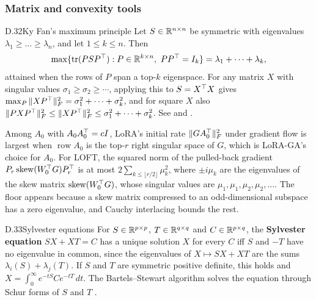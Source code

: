 \subsubsection*{Matrix and convexity tools}

\begin{bgfact}{D.32}{Ky Fan's maximum principle}
Let $S\in\mathbb{R}^{n\times n}$ be symmetric with eigenvalues $\lambda_1\ge\dots\ge\lambda_n$, and let $1\le k\le n$. Then
\[\max\{\tr(PSP\T):P\in\R^{k\times n},\ PP\T=I_k\}=\lambda_1+\dots+\lambda_k,\]
attained when the rows of $P$ span a top-$k$ eigenspace. For any matrix $X$ with singular values
$\sigma_1\ge\sigma_2\ge\cdots$, applying this to $S=X^{\top} X$ gives $\max_P\|XP^{\top}\|_F^2=\sigma_1^2+\dots+\sigma_k^2$, and
for square $X$ also $\|PXP^{\top}\|_F^2\le\|XP^{\top}\|_F^2\le\sigma_1^2+\dots+\sigma_k^2$. See \citet{xfan1949theorem} and
\citet[Ch.~III]{xbhatia1997matrix}.
\end{bgfact}

Among $A_0$ with $A_0A_0^{\top}=cI$, LoRA's initial rate $\|GA_0^{\top}\|_F^2$ under gradient flow is largest when
$\operatorname{row}A_0$ is the top-$r$ right singular space of $G$, which is LoRA-GA's \citep{wang2024lorab} choice for
$A_0$. For LOFT, the squared norm of the pulled-back gradient $P_r\operatorname{skew}(W_0^{\top} G)P_r^{\top}$ is at most $2\sum_{k\le\lfloor
r/2\rfloor}\mu_k^2$, where $\pm i\mu_k$ are the eigenvalues of the skew matrix $\operatorname{skew}(W_0^{\top} G)$, whose singular values
are $\mu_1,\mu_1,\mu_2,\mu_2,\dots$. The floor appears because a skew matrix compressed to an odd-dimensional subspace
has a zero eigenvalue, and Cauchy interlacing bounds the rest.


\begin{bgfact}{D.33}{Sylvester equations}
For $S\in\mathbb{R}^{p\times p}$, $T\in\mathbb{R}^{q\times q}$ and $C\in\mathbb{R}^{p\times q}$, the \textbf{Sylvester equation} $SX+XT=C$ has a
unique solution $X$ for every $C$ iff $S$ and $-T$ have no eigenvalue in common, since the eigenvalues of $X\mapsto
SX+XT$ are the sums $\lambda_i(S)+\lambda_j(T)$. If $S$ and $T$ are symmetric positive definite, this holds and
$X=\int_0^\infty e^{-tS}Ce^{-tT}\,dt$. The Bartels--Stewart algorithm \citep{xbartels1972algorithm} solves the equation
through Schur forms of $S$ and $T$ \citep[Ch.~4]{xhorn1991topics}.
\end{bgfact}

